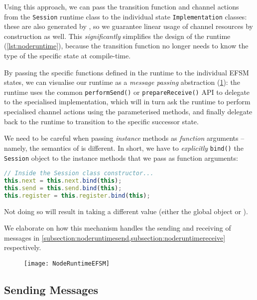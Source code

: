Using this approach,
we can pass the transition function and channel actions 
from the \texttt{Session} runtime class
to the individual state \texttt{Implementation} classes:
these are also generated by , so we
guarantee linear usage of channel resources by construction as well.
This \textit{significantly} simplifies the design of the runtime
(\cref{lst:noderuntime}),
because the transition function no longer needs to know the type 
of the specific state at compile-time.

By passing the specific functions defined in the runtime
to the individual EFSM states, we can visualise our runtime
as a \textit{message passing} abstraction 
(\cref{fig:noderuntimeefsm}): the runtime uses the common
\texttt{performSend()} or \texttt{prepareReceive()} API
to delegate to the specialised implementation, which will in turn
ask the runtime to perform specialised channel actions using
the parameterised methods, and finally delegate back to
the runtime to transition to the specific successor state.

\begin{remark}
We need to be careful when passing \textit{instance} methods
as \textit{function} arguments 
-- namely, the semantics of  is different.
In short, we have to \textit{explicitly}
\texttt{bind()} the \texttt{Session} object
to the instance methods that we pass as function arguments:

\begin{lstlisting}[language=javascript,tabsize=2]
// Inside the Session class constructor...
this.next = this.next.bind(this);
this.send = this.send.bind(this);
this.register = this.register.bind(this);
\end{lstlisting}

Not doing so will result in  taking
a different value 
(either the global object or ).
\end{remark}

We elaborate on how this mechanism
handles the sending and receiving of messages in
\cref{subsection:noderuntimesend,subsection:noderuntimereceive}
respectively.

\begin{figure}[!ht]
\centering
\texttt{[image: NodeRuntimeEFSM]}
\label{fig:noderuntimeefsm}
\end{figure}

\subsection{Sending Messages}
\label{subsection:noderuntimesend}

